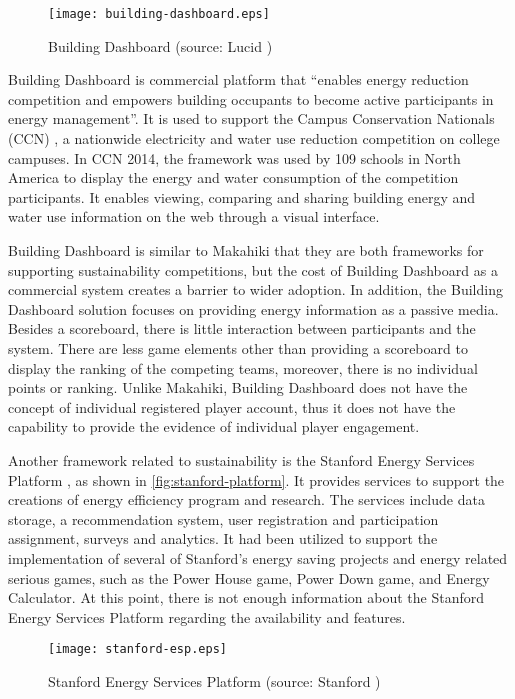 \begin{figure}[ht!]
	\centering
		\texttt{[image: building-dashboard.eps]}
		\caption{Building Dashboard (source: Lucid \cite{building-dashboard})}
		\label{fig:building-dashboard}
\end{figure}

Building Dashboard is commercial platform that ``enables energy reduction competition and empowers building occupants to become active participants in energy management''. It is used to support the Campus Conservation Nationals (CCN) \cite{competetoreduce}, a nationwide electricity and water use reduction competition on college campuses. In CCN 2014, the framework was used by 109 schools in North America to display the energy and water consumption of the competition participants. It enables viewing, comparing and sharing building energy
and water use information on the web through a visual interface.

Building Dashboard is similar to Makahiki that they are both frameworks for supporting sustainability competitions, but the
cost of Building Dashboard as a commercial system creates a barrier to wider adoption. In addition, the
Building Dashboard solution focuses on providing energy information as a passive media. Besides a scoreboard, there is little interaction between participants and the system. There are less game elements other than providing a scoreboard to display the ranking of the competing teams, moreover, there is no individual points or ranking. Unlike Makahiki, Building Dashboard does not have the concept of individual registered player account, thus it does not have the capability to provide the evidence of individual player engagement.

Another framework related to sustainability is the Stanford Energy Services Platform \cite{Armel-2012}, as shown in \autoref{fig:stanford-platform}. It provides services to support the creations of energy efficiency program and research. The services include data storage, a recommendation system, user registration and participation assignment, surveys and analytics. It had been utilized to support the implementation of several of Stanford's energy saving projects and energy related serious games, such as the Power House game, Power Down game, and Energy Calculator. At this point, there is not enough information about the Stanford Energy Services Platform regarding the availability and features. 

\begin{figure}[ht!]
	\centering
		\texttt{[image: stanford-esp.eps]}
		\caption{Stanford Energy Services Platform (source: Stanford \cite{Armel-2012})}
		\label{fig:stanford-platform}
\end{figure}
 
